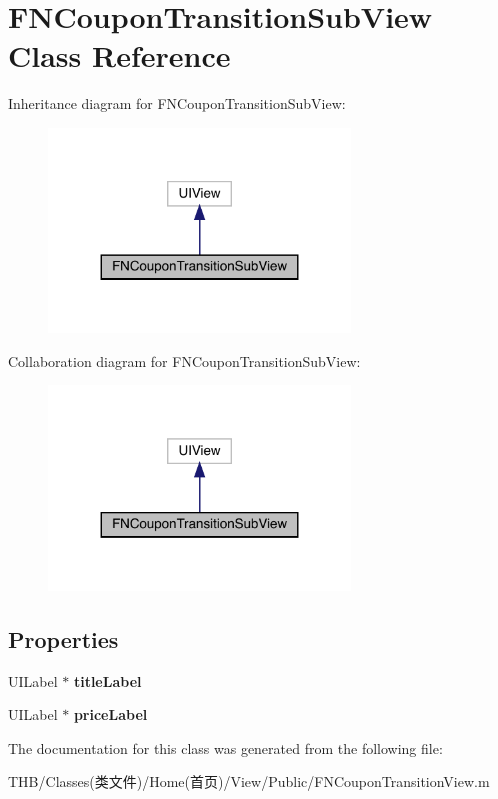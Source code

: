 \hypertarget{interface_f_n_coupon_transition_sub_view}{}\section{F\+N\+Coupon\+Transition\+Sub\+View Class Reference}
\label{interface_f_n_coupon_transition_sub_view}


Inheritance diagram for F\+N\+Coupon\+Transition\+Sub\+View\+:\nopagebreak
\begin{figure}[H]
\begin{center}
\leavevmode
\includegraphics[width=227pt]{interface_f_n_coupon_transition_sub_view__inherit__graph}
\end{center}
\end{figure}


Collaboration diagram for F\+N\+Coupon\+Transition\+Sub\+View\+:\nopagebreak
\begin{figure}[H]
\begin{center}
\leavevmode
\includegraphics[width=227pt]{interface_f_n_coupon_transition_sub_view__coll__graph}
\end{center}
\end{figure}
\subsection*{Properties}
\begin{DoxyCompactItemize}
\item 
\mbox{\label{interface_f_n_coupon_transition_sub_view_a343a7b816642ad777842a9ca63aea67b}} 
U\+I\+Label $\ast$ {\bfseries title\+Label}
\item 
\mbox{\label{interface_f_n_coupon_transition_sub_view_a9699ebfa79d9cbd04e646dabe405a5f8}} 
U\+I\+Label $\ast$ {\bfseries price\+Label}
\end{DoxyCompactItemize}


The documentation for this class was generated from the following file\+:\begin{DoxyCompactItemize}
\item 
T\+H\+B/\+Classes(类文件)/\+Home(首页)/\+View/\+Public/F\+N\+Coupon\+Transition\+View.\+m\end{DoxyCompactItemize}
